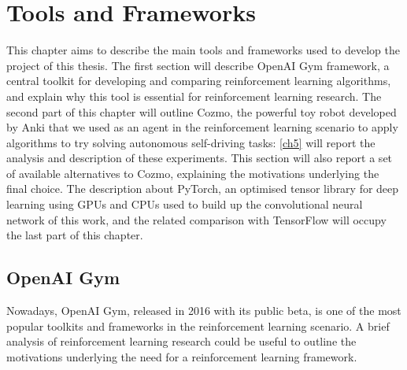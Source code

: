 
\chapter{Tools and Frameworks}

This chapter aims to describe the main tools and frameworks used to develop the project of this thesis. The first section will describe OpenAI Gym framework, a central toolkit for developing and comparing reinforcement learning algorithms, and explain why this tool is essential for reinforcement learning research.
The second part of this chapter will outline Cozmo, the powerful toy robot developed by Anki that we used as an agent in the reinforcement learning scenario to apply algorithms to try solving autonomous self-driving tasks: \vref{ch5} will report the analysis and description of these experiments. This section will also report a set of available alternatives to Cozmo, explaining the motivations underlying the final choice.
The description about PyTorch, an optimised tensor library for deep learning using GPUs and CPUs used to build up the convolutional neural network of this work, and the related comparison with TensorFlow will occupy the last part of this chapter.

\section{OpenAI Gym}

Nowadays, OpenAI Gym, released in 2016 with its public beta, is one of the most popular toolkits and frameworks in the reinforcement learning scenario. A brief analysis of reinforcement learning research could be useful to outline the motivations underlying the need for a reinforcement learning framework.

